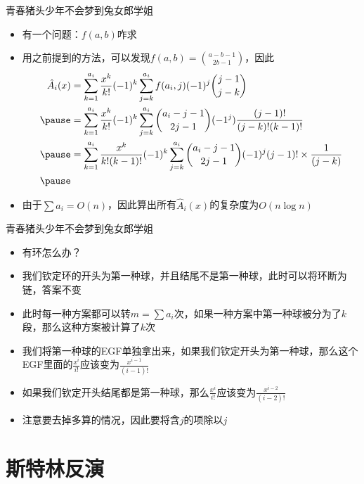 \documentclass{beamer}
\begin{document}
\begin{frame}{青春猪头少年不会梦到兔女郎学姐}
    \begin{itemize}
        \item 有一个问题：$f(a, b)$咋求 \pause
        \item 用之前提到的方法，可以发现$f(a, b) = {a - b - 1\choose 2b - 1}$，因此 \pause
        $$\begin{aligned}
            \hat A_i(x) &= \sum_{k = 1}^{a_i}\frac{x^k}{k!}(-1)^k \sum_{j = k}^{a_i} f(a_i, j)(-1)^j{j - 1\choose j - k}\\ \pause
            &= \sum_{k = 1}^{a_i}\frac{x^k}{k!}(-1)^k \sum_{j = k}^{a_i}{a_i - j - 1\choose 2j - 1}(-1^j)\frac{(j - 1)!}{(j - k)!(k - 1)!}\\ \pause
            &= \sum_{k = 1}^{a_i}\frac{x^k}{k!(k - 1)!}(-1)^k \sum_{j = k}^{a_i}{a_i - j - 1\choose 2j - 1}(-1)^j(j - 1)!\times \frac{1}{(j - k)}\\ \pause
        \end{aligned}$$
        \item 由于$\sum a_i = O(n)$，因此算出所有$\hat A_i(x)$的复杂度为$O(n\log n)$
    \end{itemize}
\end{frame}

\begin{frame}{青春猪头少年不会梦到兔女郎学姐}
    \begin{itemize}
        \item 有环怎么办？\pause
        \item 我们钦定环的开头为第一种球，并且结尾不是第一种球，此时可以将环断为链，答案不变 \pause
        \item 此时每一种方案都可以转$m = \sum a_i$次，如果一种方案中第一种球被分为了$k$段，那么这种方案被计算了$k$次 \pause
        \item 我们将第一种球的EGF单独拿出来，如果我们钦定开头为第一种球，那么这个EGF里面的$\frac{x^i}{i!}$应该变为$\frac{x^{i - 1}}{(i - 1)!}$ \pause
        \item 如果我们钦定开头结尾都是第一种球，那么$\frac{x^i}{i!}$应该变为$\frac{x^{i - 2}}{(i - 2)!}$ \pause
        \item 注意要去掉多算的情况，因此要将含$j$的项除以$j$
    \end{itemize}
\end{frame}

\section{斯特林反演}
\end{document}

